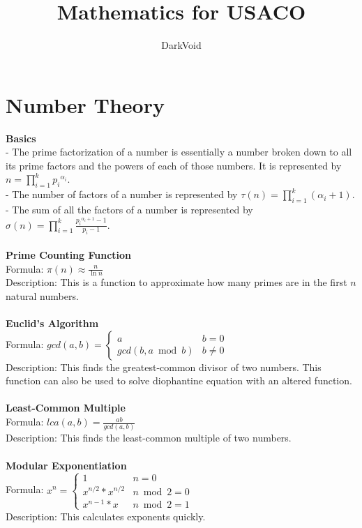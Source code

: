 \documentclass[12pt]{report}
\title{Mathematics for USACO}
\author{DarkVoid}
\begin{document}
\maketitle
\section{Number Theory}
\textbf{Basics}\\
- The prime factorization of a number is essentially a number broken down to all its prime factors and the powers of each of those numbers. It is represented by \(n=\prod_{i=1}^{k}{{p_i}^{\alpha_i}}\).\\
- The number of factors of a number is represented by \(\tau(n)=\prod_{i=1}^{k}(\alpha_i+1)\).\\
- The sum of all the factors of a number is represented by \(\sigma(n)=\prod_{i=1}^{k}{\frac{{p_i}^{\alpha_i+1}-1}{p_i-1}}\).\\\\
\textbf{Prime Counting Function}\\
Formula: \(\pi(n)\approx\frac{n}{\ln{n}}\)\\
Description: This is a function to approximate how many primes are in the first \(n\) natural numbers.\\\\
\textbf{Euclid's Algorithm}\\
Formula: \(gcd(a,b)=\begin{cases}a&b=0\\gcd(b,a\bmod{b})&b\neq{0}\end{cases}\)\\
Description: This finds the greatest-common divisor of two numbers. This function can also be used to solve diophantine equation with an altered function.\\\\
\textbf{Least-Common Multiple}\\
Formula: \(lca(a,b)=\frac{ab}{gcd(a,b)}\)\\
Description: This finds the least-common multiple of two numbers.\\\\
\textbf{Modular Exponentiation}\\
Formula: \(x^n=\begin{cases}1&n=0\\x^{n/2}*x^{n/2}&n\bmod{2}=0\\x^{n-1}*x&n\bmod{2}=1\end{cases}\)\\
Description: This calculates exponents quickly.\\\\
\end{document}
